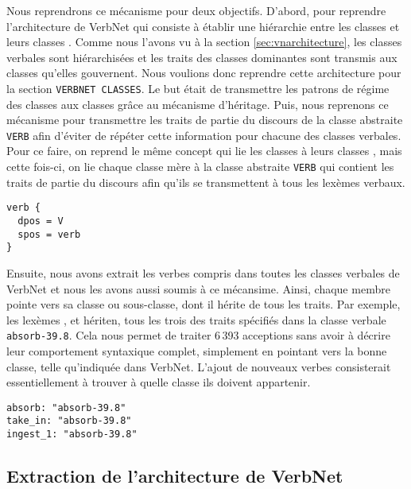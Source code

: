 Nous reprendrons ce mécanisme pour deux objectifs. D'abord, pour reprendre l'architecture de VerbNet qui consiste à établir une hiérarchie entre les classes  et leurs classes . Comme nous l'avons vu à la section \ref{sec:vnarchitecture}, les classes verbales sont hiérarchisées et les traits des classes dominantes sont transmis aux classes qu'elles gouvernent. Nous voulions donc reprendre cette architecture pour la section \texttt{VERBNET CLASSES}. Le but était de transmettre les patrons de régime des classes  aux classes  grâce au mécanisme d'héritage. Puis, nous reprenons ce mécanisme pour transmettre les traits de partie du discours de la classe abstraite \texttt{VERB} afin d'éviter de répéter cette information pour chacune des classes verbales. Pour ce faire, on reprend le même concept qui lie les classes  à leurs classes , mais cette fois-ci, on lie chaque classe mère à la classe abstraite \texttt{VERB} qui contient les traits de partie du discours afin qu'ils se transmettent à tous les lexèmes verbaux.

\begin{lstlisting}[language=mate, caption=Traits de la classe abstraite \texttt{VERB}]
verb {
  dpos = V
  spos = verb
}
\end{lstlisting}

Ensuite, nous avons extrait les verbes compris dans toutes les classes verbales de VerbNet et nous les avons aussi soumis à ce mécansime. Ainsi, chaque membre pointe vers sa classe ou sous-classe, dont il hérite de tous les traits. Par exemple, les lexèmes ,  et  hériten, tous les trois des traits spécifiés dans la classe verbale \texttt{absorb-39.8}. Cela nous permet de traiter 6\,393 acceptions sans avoir à décrire leur comportement syntaxique complet, simplement en pointant vers la bonne classe, telle qu'indiquée dans VerbNet. L'ajout de nouveaux verbes consisterait essentiellement à trouver à quelle classe ils doivent appartenir.

\begin{lstlisting}[language=mate, caption=Membres verbaux pointant vers leur classe]
absorb: "absorb-39.8"
take_in: "absorb-39.8"
ingest_1: "absorb-39.8"
\end{lstlisting}


\subsection{Extraction de l'architecture de VerbNet}

